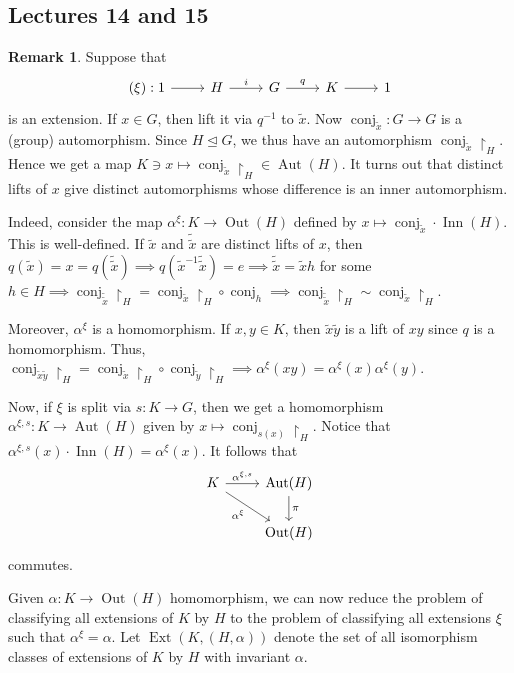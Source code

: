 \documentclass[10pt,letterpaper,cm]{nupset}
\theoremstyle{definition}
\newtheorem{remark}{Remark}
\newcommand{\1}{\mathbf{1}}
\newcommand{\0}{\vec 0}
\DeclareMathOperator{\aut}{Aut}
\DeclareMathOperator{\ext}{Ext}
\DeclareMathOperator{\inn}{Inn}
\DeclareMathOperator{\out}{Out}
\DeclareMathOperator{\conj}{conj}
\begin{document}
\subsection{Lectures 14 and 15}

\begin{remark} 
Suppose that 
\[ 
\begin{tikzcd}
(\xi): 1 \arrow[r] & H \arrow[r, "i"] & G \arrow[r, "q"] & K \arrow[r] & 1
\end{tikzcd}
\]
is an extension. If $x \in G$, then lift it via $q^{-1}$ to $\tilde{x}$. Now $\conj_{\tilde{x}} : G \to G$ is a (group) automorphism. Since $H\unlhd G$, we thus have an automorphism $\conj_{\tilde{x}}\restriction_H$. Hence we get a map $K \ni x \mapsto \conj_{\tilde{x}}\restriction_H \in \aut(H)$. It turns out that distinct lifts of $x$ give distinct automorphisms whose difference is an inner automorphism.

Indeed, consider the map $\alpha^{\xi} : K \to \out(H)$ defined by $x \mapsto \conj_{\tilde{x}}\cdot \inn(H)$. This is well-defined. If $\tilde{x}$ and $\tilde{\tilde{x}}$ are distinct lifts of $x$, then $q(\tilde{x}) = x = q(\tilde{\tilde{x}}) \implies q(\tilde{x}^{-1}\tilde{\tilde{x}}) = e \implies \tilde{\tilde{x}} = \tilde{x}h$ for some $h \in H \implies \conj_{\tilde{\tilde{x}}}\restriction_H= \conj_{\tilde{x}}\restriction_H \circ \conj_h \implies \conj_{\tilde{\tilde{x}}}\restriction_H\sim \conj_{\tilde{x}}\restriction_H$.

Moreover, $\alpha^{\xi}$ is a homomorphism. If $x, y \in K$, then $\tilde{x}\tilde{y}$ is a lift of $xy$ since $q$ is a homomorphism.  Thus, $\conj_{\tilde{x}\tilde{y}}\restriction_H = \conj_{\tilde{x}}\restriction_H \circ \conj_{\tilde{y}}\restriction_H \implies \alpha^{\xi}(xy) = \alpha^{\xi}(x) \alpha^{\xi}(y)$.

Now, if $\xi$ is split via $s: K \to G$, then we get a homomorphism $\alpha^{\xi, s} : K \to \aut(H)$ given by $x \mapsto \conj_{s(x)}\restriction_H$. Notice that $\alpha^{\xi, s}(x)\cdot \inn(H) = \alpha^{\xi}(x)$. It follows that 
\[
\begin{tikzcd}
K \arrow[r, "{\alpha^{\xi, s}}"] \arrow[rd, "\alpha^{\xi}"'] & \aut(H) \arrow[d, "\pi"] \\
 & \out(H)
\end{tikzcd}
\]
commutes.

Given $\alpha: K \to \out(H)$ homomorphism, we can now reduce the problem of classifying all extensions of $K$ by $H$ to the problem of classifying all extensions $\xi$ such that $\alpha^{\xi} = \alpha$. 
Let $\ext(K, (H, \alpha))$ denote the set of all isomorphism classes of extensions of $K$ by $H$ with invariant $\alpha$.
\end{remark}
\end{document}
